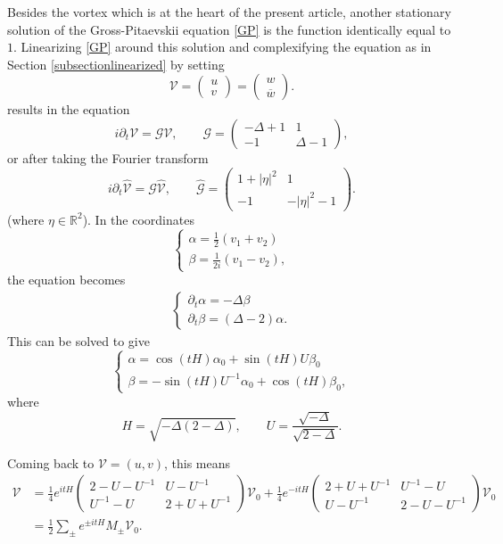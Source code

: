 \documentclass[11 pt]{amsart}
\theoremstyle{definition}
\theoremstyle{remark}
\numberwithin{equation}{section}
\begin{document}
Besides the vortex which is at the heart of the present article, another stationary solution of the Gross-Pitaevskii equation \eqref{GP} is the function identically equal to $1$. 
Linearizing \eqref{GP} around this solution and complexifying the equation as in Section \ref{subsectionlinearized} by setting
$$
\mathcal{V} = \begin{pmatrix} u \\ v \end{pmatrix} = \begin{pmatrix} w \\ \overline{w} \end{pmatrix}.
$$
results in the equation
$$
i \partial_t \mathcal{V} = \mathcal{G} \mathcal{V}, \qquad 
\mathcal{G} = \begin{pmatrix} - \Delta + 1 & 1 \\ -1 & \Delta - 1 \end{pmatrix},
$$
or after taking the Fourier transform
$$
i \partial_t \widehat{\mathcal{V}} = \widehat{\mathcal{G}} \widehat{\mathcal{V}}, \qquad 
\widehat{\mathcal{G}} = \begin{pmatrix} 1 + |\eta|^2 & 1 \\ -1 & -|\eta|^2 - 1 \end{pmatrix}.
$$
(where $\eta \in \mathbb{R}^2$). In the coordinates
$$
\begin{cases} \alpha = \frac{1}{2}(v_1 + v_2) \\ \beta= \frac{1}{2i}(v_1 - v_2),
\end{cases}
$$
the equation becomes
\begin{align*}
\begin{cases}
\partial_t {\alpha} = - \Delta {\beta} \\
\partial_t {\beta} = (\Delta - 2) {\alpha}.
\end{cases}
\end{align*}
This can be solved to give
\begin{equation}
\label{formulaalphabeta}
\begin{cases}
\alpha = \cos(tH) \alpha_0 + \sin(tH) U \beta_0 \\
\beta = -\sin(tH) U^{-1} \alpha_0 + \cos(tH) \beta_0, 
\end{cases}
\end{equation}
where
\begin{equation}
\label{defHU}
H = \sqrt{-\Delta(2-\Delta)}, \qquad U = \frac{\sqrt{-\Delta}}{\sqrt{2-\Delta}}.
\end{equation}

Coming back to $\mathcal{V} = (u,v)$, this means
\begin{align*}
\mathcal{V}  & = \frac 14 e^{itH}
\begin{pmatrix} 2 - U-U^{-1} & U-U^{-1} \\
U^{-1}-U & 2+ U+U^{-1} \end{pmatrix} \mathcal{V}_0 + \frac 14 e^{-itH}
\begin{pmatrix} 2 + U+U^{-1} & U^{-1}-U \\
U-U^{-1} & 2- U-U^{-1} \end{pmatrix} \mathcal{V}_0 \\
& = \frac 1 2 \sum_{\pm} e^{\pm it H} M_{\pm} \mathcal{V}_0.
\end{align*}
\end{document}
